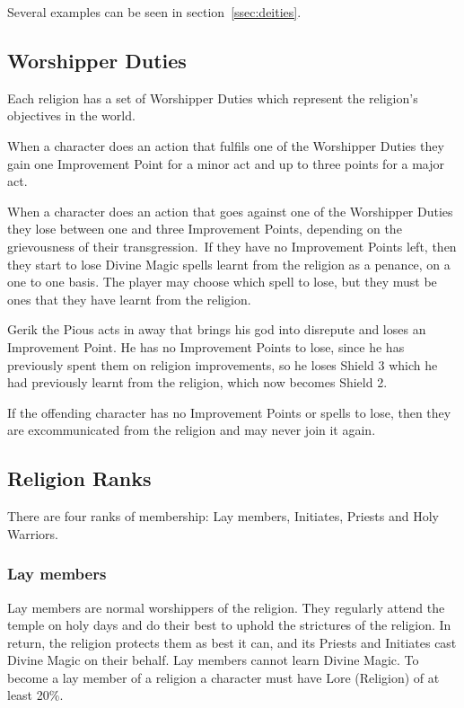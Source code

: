 Several examples can be seen in section~\ref{ssec:deities}.

\subsection{Worshipper Duties}
Each religion has a set of Worshipper Duties which represent the religion’s objectives in the world.

When a character does an action that fulfils one of the Worshipper Duties they gain one Improvement Point for a minor act and up to three points for a major act.

When a character does an action that goes against one of the Worshipper Duties they lose between one and three Improvement Points, depending on the grievousness of their transgression. If they have no Improvement Points left, then they start to lose Divine Magic spells learnt from the religion as a penance, on a one to one basis. The player may choose which spell to lose, but they must be ones that they have learnt from the religion.

\begin{rpg-examplebox}
Gerik the Pious acts in away that brings his god into disrepute and loses an Improvement Point. He has no Improvement Points to lose, since he has previously spent them on religion improvements, so he loses Shield 3 which he had previously learnt from the religion, which now becomes Shield 2.
\end{rpg-examplebox}

If the offending character has no Improvement Points or spells to lose, then they are excommunicated from the religion and may never join it again.

\subsection{Religion Ranks}
There are four ranks of membership: Lay members, Initiates, Priests and Holy Warriors.

\subsubsection{Lay members}
Lay members are normal worshippers of the religion. They regularly attend the temple on holy days and do their best to uphold the strictures of the religion. In return, the religion protects them as best it can, and its Priests and Initiates cast Divine Magic on their behalf. Lay members cannot learn Divine Magic. To become a lay member of a religion a character must have Lore (Religion) of at least 20\%. 

